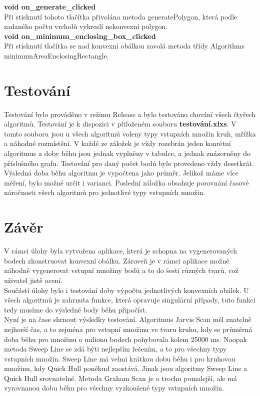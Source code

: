 \documentclass[a4paper,11pt,twoside]{article}
\begin{document}
\noindent\textbf{void on\_generate\_clicked}\\
Při stisknutí tohoto tlačítka přivolána metoda generatePolygon, která podle zadaného počtu vrcholů vykreslí nekonvexní polygon.\\

\noindent\textbf{void on\_minimum\_enclosing\_box\_clicked}\\
Při stisknutí tlačítka se nad konvexní obálkou zavolá metoda třídy Algorithms minimumAreaEnclosingRectangle.

\section{Testování}
Testování bylo prováděno v režimu Release a bylo testováno chování všech čtyřech algoritmů. Testování je k dispozici v přiloženém souboru \textbf{testování.xlxs}. V tomto souboru jsou u všech algoritmů voleny typy vstupních množin kruh, mřížka a náhodné rozmístění. V každé ze záložek je vždy rozebrán jeden konrétní algoritmus a doby běhu jsou jednak vyplněny v tabulce, a jednak znázorněny do příslušného grafu. Testování pro daný počet bodů bylo provedeno vždy desetkrát. Výsledná doba běhu algoritmu je vypočtena jako průměr. Jelikož máme více měření, bylo možné určit i varianci. Poslední záložka obsahuje porovnání časové náročnosti všech algoritmů pro jednotlivé typy vstupních množin.

\newpage
{}

\vspace*{-1cm}
\section{Závěr}
\noindent
\large
V rámci úlohy byla vytvořena aplikace, která je schopna na vygenerovaných bodech zkonstruovat konvexní obálku. Zároveň je v rámci aplikace možné náhodně vygenerovat vstupní množiny bodů a to do šesti různých tvarů, což uživatel jistě ocení.\\
\indent Součástí úlohy bylo i testování doby výpočtu jednotlivých konvexních obálek. U všech algoritmů je zahrnuta funkce, která opravuje singulární případy, tuto funkci tedy musíme do výsledné body běhu připočíst. \\
\indent Nyní je na čase shrnout výsledky testování. Algoritmus Jarvis Scan měl znatelně nejhorší čas, a to zejména pro vstupní množinu ve tvaru kruhu, kdy se průměrná doba běhu pro množinu o milionu bodech pohybovala kolem 25000 ms. Naopak metoda Sweep Line se zdá býti nejlepším řešením, a to pro všechny typy vstupních množin. Sweep Line má velmi krátkou dobu běhu i pro kruhovou množinu, kdy Quick Hull poněkud zaostává. Jinak jsou algoritmy Sweep Line a Quick Hull srovnatelné. Metoda Graham Scan je o trochu pomalejší, ale má vyrovnanou dobu běhu pro všechny vyzkoušené typy vstupních množin.
\end{document}
